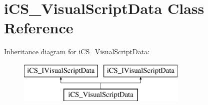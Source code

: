\hypertarget{classi_c_s___visual_script_data}{\section{i\+C\+S\+\_\+\+Visual\+Script\+Data Class Reference}
\label{classi_c_s___visual_script_data}
}
Inheritance diagram for i\+C\+S\+\_\+\+Visual\+Script\+Data\+:\begin{figure}[H]
\begin{center}
\leavevmode
\includegraphics[height=2.000000cm]{classi_c_s___visual_script_data}
\end{center}
\end{figure}

